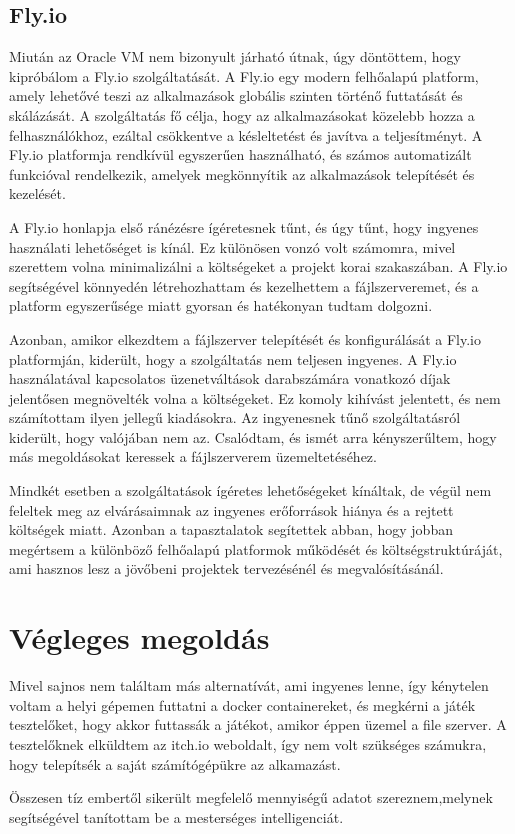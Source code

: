 \subsection{Fly.io}
Miután az Oracle VM nem bizonyult járható útnak, úgy döntöttem, hogy kipróbálom a Fly.io szolgáltatását.
A Fly.io egy modern felhőalapú platform, amely lehetővé teszi az alkalmazások globális szinten történő futtatását és skálázását. A szolgáltatás fő célja, hogy az alkalmazásokat közelebb hozza a felhasználókhoz, ezáltal csökkentve a késleltetést és javítva a teljesítményt. A Fly.io platformja rendkívül egyszerűen használható, és számos automatizált funkcióval rendelkezik, amelyek megkönnyítik az alkalmazások telepítését és kezelését.

A Fly.io honlapja első ránézésre ígéretesnek tűnt, és úgy tűnt, hogy ingyenes használati lehetőséget is kínál. Ez különösen vonzó volt számomra, mivel szerettem volna minimalizálni a költségeket a projekt korai szakaszában. A Fly.io segítségével könnyedén létrehozhattam és kezelhettem a fájlszerveremet, és a platform egyszerűsége miatt gyorsan és hatékonyan tudtam dolgozni.

Azonban, amikor elkezdtem a fájlszerver telepítését és konfigurálását a Fly.io platformján, kiderült, hogy a szolgáltatás nem teljesen ingyenes.
A Fly.io használatával kapcsolatos üzenetváltások darabszámára vonatkozó díjak jelentősen 
megnövelték volna a költségeket. Ez komoly kihívást jelentett, és nem számítottam ilyen jellegű kiadásokra. 
Az ingyenesnek tűnő szolgáltatásról kiderült, 
hogy valójában nem az. Csalódtam, és ismét arra kényszerűltem, hogy más megoldásokat keressek a fájlszerverem üzemeltetéséhez.

Mindkét esetben a szolgáltatások ígéretes lehetőségeket kínáltak, de végül nem feleltek meg az elvárásaimnak az ingyenes erőforrások hiánya és a rejtett költségek miatt. Azonban a tapasztalatok segítettek abban, hogy jobban megértsem a különböző felhőalapú platformok működését és költségstruktúráját, ami hasznos lesz a jövőbeni projektek tervezésénél és megvalósításánál.
\section{Végleges megoldás}
Mivel sajnos nem találtam más alternatívát, ami ingyenes lenne, így kénytelen voltam a helyi gépemen futtatni a docker containereket, és megkérni a játék tesztelőket, hogy akkor futtassák a játékot, amikor éppen üzemel a file szerver. A tesztelőknek elküldtem az itch.io weboldalt, így nem volt szükséges számukra, hogy telepítsék a saját számítógépükre az alkamazást.

Összesen tíz embertől sikerült megfelelő mennyiségű adatot szereznem,melynek segítségével tanítottam be a mesterséges intelligenciát.